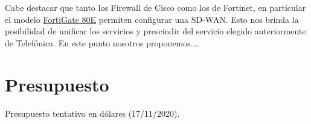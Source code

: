 \documentclass[11pt]{article}
\begin{document}
    Cabe destacar que tanto los Firewall de Cisco como los de Fortinet, en particular el modelo 
    \href{https://www.fortinet.com/content/dam/fortinet/assets/data-sheets/FortiGate_80E_Series.pdf}{FortiGate 80E} permiten configurar una SD-WAN. Esto nos brinda la 
    posibilidad de unificar los servicios y prescindir del servicio elegido anteriormente de Telefónica. En este punto nosotros proponemos....

    \section{Presupuesto}

    \begin{table}[H]
        \centering
        
        \caption{Presupuesto tentativo en dólares (17/11/2020).}
    \end{table}

    
\end{document}
